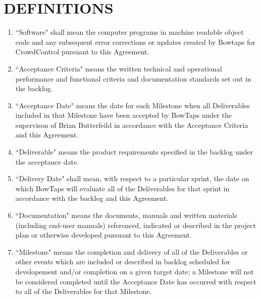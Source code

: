 \documentclass[11pt]{article}
\begin{document}
\section{DEFINITIONS }
\begin{enumerate}  \itemsep4pt \parskip0pt 
\item ``Software" shall mean the computer programs in machine readable       object code and any subsequent error corrections or updates       created by Bowtaps for CrowdControl pursuant to this Agreement.   
   
\item ``Acceptance Criteria" means the written technical and operational       performance and functional criteria and documentation standards       set out in the backlog.    

\item ``Acceptance Date" means the date for each Milestone when all       Deliverables included in that Milestone have been accepted by       BowTaps under the supervison of Brian Butterfeild in accordance with the Acceptance Criteria and this       Agreement. 

\item  ``Deliverable" means the product requirements specified in the backlog under the acceptance date.   

\item  ``Delivery Date" shall mean, with respect to a particular       sprint, the date on which BowTaps will evaluate       all of the Deliverables for that sprint in accordance with       the backlog and this Agreement.    

\item  ``Documentation" means the documents, manuals and written materials       (including end-user manuals) referenced, indicated or described       in the project plan or otherwise developed pursuant to this       Agreement.    

\item  ``Milestone" means the completion and delivery of all of the       Deliverables or other events which are included or described in       backlog  scheduled for developement and/or completion on a       given target date; a Milestone will not be considered completed       until the Acceptance Date has occurred with respect to all of the       Deliverables for that Milestone.  
\end{enumerate}
\end{document}

